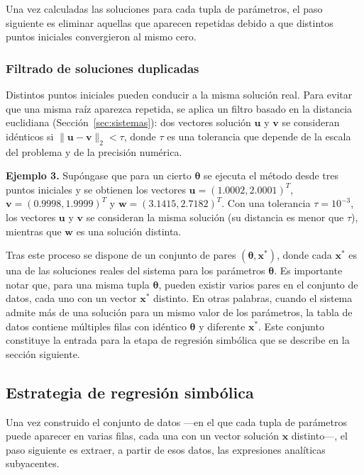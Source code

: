 \documentclass[12pt,a4paper]{article} \usepackage[utf8]{inputenc} \usepackage[spanish]{babel} \usepackage{amsmath, amssymb, amsthm} \usepackage{bm} \usepackage{float} \usepackage{longtable} \usepackage[hidelinks]{hyperref}
\newcommand{\xvec}{\mathbf{x}} \newcommand{\thetavec}{\boldsymbol{\theta}} \newcommand{\Fvec}{\mathbf{F}} \newcommand{\R}{\mathbb{R}} \newcommand{\norm}[1]{\left\lVert#1\right\rVert} \newcommand{\loss}{\mathcal{L}} \newcommand{\dataset}{\mathcal{D}} \newcommand{\jac}{\mathbf{J}}
\begin{document}
Una vez calculadas las soluciones para cada tupla de parámetros, el paso siguiente es eliminar aquellas que aparecen repetidas debido a que distintos puntos iniciales convergieron al mismo cero.

\subsubsection{Filtrado de soluciones duplicadas}

Distintos puntos iniciales pueden conducir a la misma solución real.
Para evitar que una misma raíz aparezca repetida, se aplica un filtro
basado en la distancia euclidiana
(Sección~\ref{sec:sistemas}): dos vectores solución \(\mathbf{u}\) y
\(\mathbf{v}\) se consideran idénticos si
\(\|\mathbf{u} - \mathbf{v}\|_2 < \tau\), donde \(\tau\) es una
tolerancia que depende de la escala del problema y de la precisión
numérica.

\bigskip
\noindent\textbf{Ejemplo 3.} Supóngase que para un cierto \(\thetavec\)
se ejecuta el método desde tres puntos iniciales y se obtienen los
vectores
\(\mathbf{u} = (1.0002, 2.0001)^T\),
\(\mathbf{v} = (0.9998, 1.9999)^T\) y
\(\mathbf{w} = (3.1415, 2.7182)^T\). Con una tolerancia
\(\tau = 10^{-3}\), los vectores \(\mathbf{u}\) y \(\mathbf{v}\) se
consideran la misma solución (su distancia es menor que \(\tau\)),
mientras que \(\mathbf{w}\) es una solución distinta.

\bigskip
Tras este proceso se dispone de un conjunto de pares
\((\thetavec, \xvec^*)\), donde cada \(\xvec^*\) es una de las
soluciones reales del sistema para los parámetros \(\thetavec\). Es
importante notar que, para una misma tupla \(\thetavec\), pueden
existir varios pares en el conjunto de datos, cada uno con un vector
\(\xvec^*\) distinto. En otras palabras, cuando el sistema admite más
de una solución para un mismo valor de los parámetros, la tabla de
datos contiene múltiples filas con idéntico \(\thetavec\) y diferente
\(\xvec^*\). Este conjunto constituye la entrada para la etapa de
regresión simbólica que se describe en la sección siguiente.


\subsection{Estrategia de regresión simbólica}
\label{sec:estrategia_sr}

Una vez construido el conjunto de datos —en el que cada tupla de
parámetros puede aparecer en varias filas, cada una con un vector
solución \(\xvec\) distinto—, el paso siguiente es extraer, a partir
de esos datos, las expresiones analíticas subyacentes.
\end{document}
